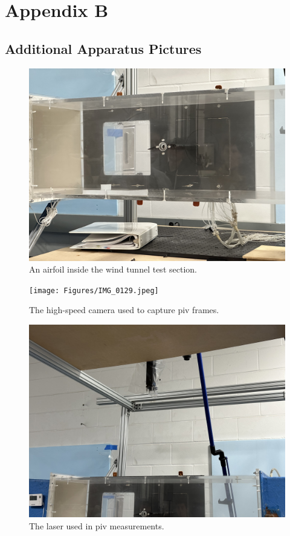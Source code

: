 \chapter{Appendix B}

\section{Additional Apparatus Pictures} \label{sec:additional_apparatus}

\begin{figure}[htpb]
    \centering
    \includegraphics[width=\linewidth]{Figures/IMG_0127.jpeg}
    \caption{An airfoil inside the wind tunnel test section.}
    \label{fig:test_section}
\end{figure}

\begin{figure}[htpb]
    \centering
    \texttt{[image: Figures/IMG\_0129.jpeg]}
    \caption{The high-speed camera used to capture \acrshort{piv} frames.}
    \label{fig:high-speed_camera}
\end{figure}

\begin{figure}[htpb]
    \centering
    \includegraphics[width=\linewidth]{Figures/IMG_0130.jpeg}
    \caption{The laser used in \acrshort{piv} measurements.}
    \label{fig:laser}
\end{figure}

